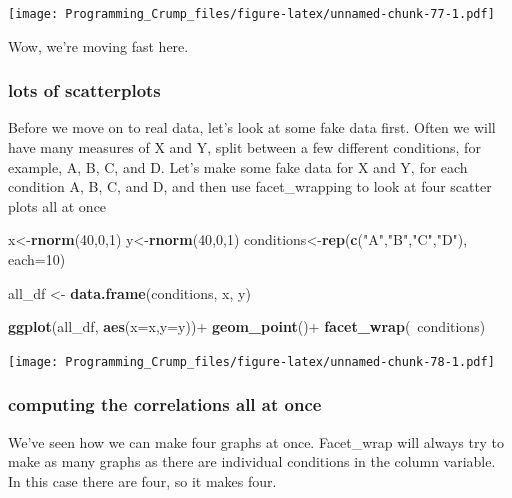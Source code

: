 \documentclass[]{book}
\newenvironment{Shaded}{\begin{snugshade}}{\end{snugshade}}
\newcommand{\KeywordTok}[1]{\textcolor[rgb]{0.13,0.29,0.53}{\textbf{{#1}}}}
\newcommand{\DataTypeTok}[1]{\textcolor[rgb]{0.13,0.29,0.53}{{#1}}}
\newcommand{\DecValTok}[1]{\textcolor[rgb]{0.00,0.00,0.81}{{#1}}}
\newcommand{\StringTok}[1]{\textcolor[rgb]{0.31,0.60,0.02}{{#1}}}
\newcommand{\NormalTok}[1]{{#1}}
\theoremstyle{definition}
\theoremstyle{definition}
\theoremstyle{definition}
\theoremstyle{remark}
\begin{document}
\texttt{[image: Programming\_Crump\_files/figure-latex/unnamed-chunk-77-1.pdf]}

Wow, we're moving fast here.

\subsubsection{lots of scatterplots}\label{lots-of-scatterplots}

Before we move on to real data, let's look at some fake data first.
Often we will have many measures of X and Y, split between a few
different conditions, for example, A, B, C, and D. Let's make some fake
data for X and Y, for each condition A, B, C, and D, and then use
facet\_wrapping to look at four scatter plots all at once

\begin{Shaded}
\begin{Highlighting}[]
\NormalTok{x<-}\KeywordTok{rnorm}\NormalTok{(}\DecValTok{40}\NormalTok{,}\DecValTok{0}\NormalTok{,}\DecValTok{1}\NormalTok{)}
\NormalTok{y<-}\KeywordTok{rnorm}\NormalTok{(}\DecValTok{40}\NormalTok{,}\DecValTok{0}\NormalTok{,}\DecValTok{1}\NormalTok{)}
\NormalTok{conditions<-}\KeywordTok{rep}\NormalTok{(}\KeywordTok{c}\NormalTok{(}\StringTok{"A"}\NormalTok{,}\StringTok{"B"}\NormalTok{,}\StringTok{"C"}\NormalTok{,}\StringTok{"D"}\NormalTok{), }\DataTypeTok{each=}\DecValTok{10}\NormalTok{)}

\NormalTok{all_df <-}\StringTok{ }\KeywordTok{data.frame}\NormalTok{(conditions, x, y)}

\KeywordTok{ggplot}\NormalTok{(all_df, }\KeywordTok{aes}\NormalTok{(}\DataTypeTok{x=}\NormalTok{x,}\DataTypeTok{y=}\NormalTok{y))+}
\StringTok{  }\KeywordTok{geom_point}\NormalTok{()+}
\StringTok{  }\KeywordTok{facet_wrap}\NormalTok{(~conditions)}
\end{Highlighting}
\end{Shaded}

\texttt{[image: Programming\_Crump\_files/figure-latex/unnamed-chunk-78-1.pdf]}

\subsubsection{computing the correlations all at
once}\label{computing-the-correlations-all-at-once}

We've seen how we can make four graphs at once. Facet\_wrap will always
try to make as many graphs as there are individual conditions in the
column variable. In this case there are four, so it makes four.
\end{document}
